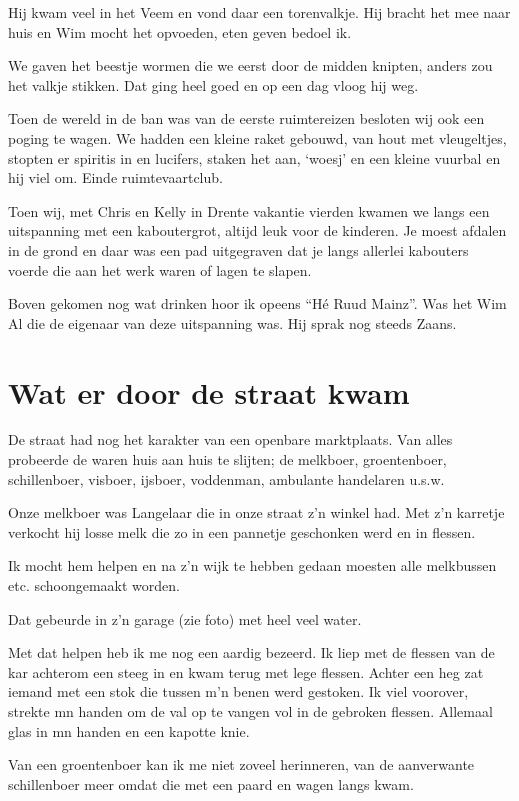 \documentclass[10pt,twoside,openright]{memoir}
\begin{document}
Hij kwam veel in het Veem en vond daar een torenvalkje. Hij bracht het mee naar huis en Wim mocht het opvoeden, eten geven bedoel ik. 

We gaven het beestje wormen die we eerst door de midden knipten, anders zou het valkje stikken. Dat ging heel goed en op een dag vloog hij weg.

Toen de wereld in de ban was van de eerste ruimtereizen besloten wij ook een poging te wagen. We hadden een kleine raket gebouwd, van hout met vleugeltjes, stopten er spiritis in en lucifers, staken het aan, ‘woesj’ en een kleine vuurbal en hij viel om. Einde ruimtevaartclub.

Toen wij, met Chris en Kelly in Drente vakantie vierden kwamen we langs een uitspanning met een kaboutergrot, altijd leuk voor de kinderen. Je moest afdalen in de grond en daar was een pad uitgegraven dat je langs allerlei kabouters voerde die aan het werk waren of lagen te slapen. 

Boven gekomen nog wat drinken hoor ik opeens ``Hé Ruud Mainz''. Was het Wim Al die de eigenaar van deze uitspanning was. Hij sprak nog steeds Zaans.

\chapter{Wat er door de straat kwam} %
\label{cha:straat}

De straat had nog het karakter van een openbare marktplaats. Van alles probeerde de waren huis aan huis te slijten; de melkboer, groentenboer, schillenboer, visboer, ijsboer, voddenman, ambulante handelaren u.s.w. 

Onze melkboer was Langelaar die in onze straat z’n winkel had. Met z’n karretje verkocht hij losse melk die zo in een pannetje geschonken werd en in flessen. 

Ik mocht hem helpen en na z’n wijk te hebben gedaan moesten alle melkbussen etc. schoongemaakt worden. 

Dat gebeurde in z’n garage (zie foto) met heel veel water. 

Met dat helpen heb ik me nog een aardig bezeerd. Ik liep met de flessen van de kar achterom een steeg in en kwam terug met lege flessen. Achter een heg zat iemand met een stok die tussen m’n benen werd gestoken. Ik viel voorover, strekte mn handen om de val op te vangen vol in de gebroken flessen. Allemaal glas in mn handen en een kapotte knie.

Van een groentenboer kan ik me niet zoveel herinneren, van de aanverwante schillenboer meer omdat die met een paard en wagen langs kwam. 
\end{document}
